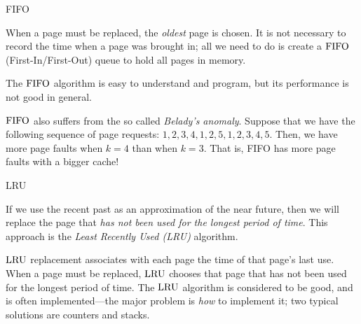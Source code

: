 \begin{frame}
{FIFO}

When a page must be replaced, the {\em oldest} page is chosen.  It is
not necessary to record the time when a page was brought in; all we
need to do is create a $\mathrm{FIFO}$ (First-In/First-Out) queue to hold all
pages in memory.  

The $\mathrm{FIFO}$ algorithm is easy to understand and program, but its
performance is not good in general.

$\mathrm{FIFO}$ also suffers from the so called {\em Belady's
anomaly}.  Suppose that we have the following
sequence of page requests: $1,2,3,4,1,2,5,1,2,3,4,5$.  Then, we have
more page faults when $k=4$ than when $k=3$.  That is, FIFO has more
page faults with a bigger cache!
\end{frame}

\begin{frame}
{LRU}

If we use the recent past as an approximation of the near future, then
we will replace the page that {\em has not been used for the longest
period of time}.  This approach is the {\em Least Recently Used (LRU)}
algorithm.

$\mathrm{LRU}$ replacement associates with each page the time of that page's
last use.  When a page must be replaced, $\mathrm{LRU}$ chooses that page that
has not been used for the longest period of time.  The $\mathrm{LRU}$
algorithm is considered to be good, and is often implemented---the
major problem is {\em how} to implement it;  two typical solutions are
counters and stacks.
\end{frame}


